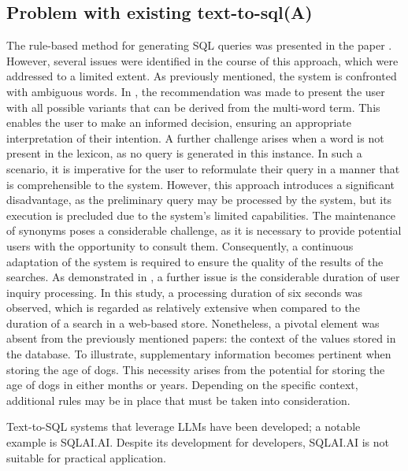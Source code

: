 \documentclass[../../submission.tex]{subfiles}
\begin{document}
\subsection{Problem with existing text-to-sql(A)}
The rule-based method for generating SQL queries was presented in the paper  \cite{popescuEtalTowardsTheoryOfNaturalLanguage}. 
However, several issues were identified in the course of this approach, which were addressed to a limited extent. 
As previously mentioned, the system is confronted with ambiguous words. 
In  \cite{popescuEtalTowardsTheoryOfNaturalLanguage}, the recommendation was made to present the user with all possible variants that can be derived from the multi-word term.  
This enables the user to make an informed decision, ensuring an appropriate interpretation of their intention. 
A further challenge arises when a word is not present in the lexicon, as no query is generated in this instance. 
In such a scenario, it is imperative for the user to reformulate their query in a manner that is comprehensible to the system. 
However, this approach introduces a significant disadvantage, as the preliminary query may be processed by the system, but its execution is precluded due to the system's limited capabilities. 
The maintenance of synonyms poses a considerable challenge, as it is necessary to provide potential users with the opportunity to consult them. Consequently, a continuous adaptation of the system is required to ensure the quality of the results of the searches. 
As demonstrated in \cite{popescuEtalTowardsTheoryOfNaturalLanguage}, a further issue is the considerable duration of user inquiry processing. In this study, a processing duration of six seconds was observed, which is regarded as relatively extensive when compared to the duration of a search in a web-based store.
Nonetheless, a pivotal element was absent from the previously mentioned papers: the context of the values stored in the database. 
To illustrate, supplementary information becomes pertinent when storing the age of dogs. 
This necessity arises from the potential for storing the age of dogs in either months or years. 
Depending on the specific context, additional rules may be in place that must be taken into consideration. 

Text-to-SQL systems that leverage LLMs have been developed; a notable example is SQLAI.AI. 
Despite its development for developers, SQLAI.AI is not suitable for practical application.
\end{document}
